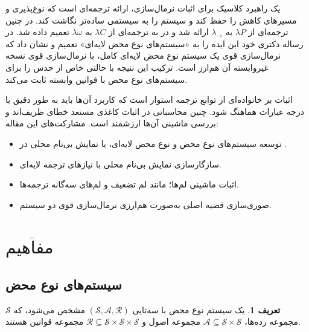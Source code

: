 \documentclass[11pt,twocolumn,a4paper,twoside]{article}
\theoremstyle{definition}
\newtheorem{definition}{تعریف}[section]
\theoremstyle{theorem}
\theoremstyle{definition}
\theoremstyle{definition}
\theoremstyle{definition}
\theoremstyle{definition}
\theoremstyle{definition}
\begin{document}
یک راهبرد کلاسیک برای اثبات نرمال‌سازی، ارائه ترجمه‌ای است که نوع‌پذیری  و مسیرهای کاهش  را حفظ کند و سیستم را به سیستمی ساده‌تر نگاشت کند.
در \cite{harper1993} چنین ترجمه‌ای از $\lambda P$ به $\lambda_\rightarrow$ ارائه شد و در \cite{geuvers1991} به ترجمه‌ای از $\lambda C$ به $\lambda \omega$ تعمیم داده شد.
 در رساله دکتری خود \cite{types2022,mull2023} این ایده را به «سیستم‌های نوع محض لایه‌ای»  تعمیم و نشان داد که نرمال‌سازی قوی یک سیستم نوع محض لایه‌ای کامل، با نرمال‌سازی قوی نسخه غیروابسته آن هم‌ارز است.
ترکیب این نتیجه با \cite{barthe2001} حالتی خاص از حدس  را برای سیستم‌های نوع محض با قوانین وابسته ثابت می‌کند.

اثبات  بر خانواده‌ای از توابع ترجمه استوار است که کاربرد آن‌ها باید به طور دقیق با درجه عبارات هماهنگ شود. چنین محاسباتی در اثبات کاغذی مستعد خطای ظریف‌اند و بررسی ماشینی آن‌ها ارزشمند است.
مشارکت‌های این مقاله:
\begin{itemize}[noitemsep, topsep=0pt]
    \item[-] توسعه سیستم‌های نوع محض و نوع محض لایه‌ای، با نمایش بی‌نام محلی  در .
    \item[-] سازگارسازی نمایش بی‌نام محلی با نیازهای ترجمه لایه‌ای.
    \item[-] اثبات ماشینی لم‌ها؛ مانند لم تضعیف و لم‌های سه‌گانه ترجمه‌ها.
    \item[-] صوری‌سازی قضیه اصلی به‌صورت هم‌ارزی نرمال‌سازی قوی دو سیستم.
\end{itemize}

\section{$\overline{\text{
 مفاهیم   
}}$}

\subsection{سیستم‌های نوع محض}

\begin{definition}\label{pts_signature}
یک سیستم‌ نوع محض با سه‌تایی $(\mathcal{S},\mathcal{A},\mathcal{R})$ مشخص می‌شود، که $\mathcal{S}$ مجموعه رده‌ها، $\mathcal{A} \subseteq \mathcal{S} \times \mathcal{S}$ مجموعه اصول و $\mathcal{R} \subseteq \mathcal{S} \times \mathcal{S} \times \mathcal{S}$ مجموعه قوانین هستند.
\end{definition}
\end{document}
